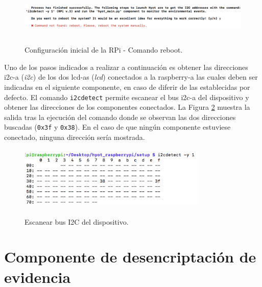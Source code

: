 \documentclass[12pt,a4paper, twoside]{report}
\begin{document}
	\begin{figure}[!ht]   
		\caption{Configuración inicial de la RPi - Comando reboot.} 
		\begin{center} 
			\includegraphics[width=17cm,height=2cm]{Images/userGuide/setup/rebootError} \\
			\label{fig:userguide_setup_error_reboot} 
		\end{center}  
	\end{figure}
	
	Uno de los pasos indicados a realizar a continuación es obtener las direcciones \gls{i2c-a} (\textit{\gls{i2c}}) de los dos \glspl{lcd-a} (\textit{\gls{lcd}}) conectados a la \gls{raspberry-a} las cuales deben ser indicadas en el siguiente componente, en caso de diferir de las establecidas por defecto. El comando \texttt{i2cdetect} permite escanear el bus \gls{i2c-a} del dispositivo y obtener las direcciones de los componentes conectados. La Figura \ref{fig:userguide_setup_i2cdetect} muestra la salida tras la ejecución del comando donde se observan las dos direcciones buscadas (\texttt{0x3f} y \texttt{0x38}). En el caso de que ningún componente estuviese conectado, ninguna dirección sería mostrada.

	\begin{figure}[!ht]   
		\caption{Escanear bus I2C del dispositivo.} 
		\begin{center} 
			\includegraphics[width=9cm,height=3cm]{Images/userGuide/setup/i2cdetect} \\
			\label{fig:userguide_setup_i2cdetect} 
		\end{center}  
	\end{figure}

	 \section{Componente de desencriptación de evidencia}
	 	 
\end{document}
